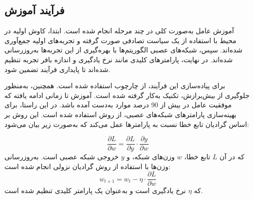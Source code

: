 \subsection{فرآیند آموزش}

آموزش عامل به‌صورت کلی در چند مرحله انجام شده است. ابتدا، کاوش اولیه در محیط با استفاده از یک سیاست تصادفی صورت گرفته و تجربه‌های اولیه جمع‌آوری شده‌اند. سپس، شبکه‌های عصبی الگوریتم‌ها با بهره‌گیری از این تجربه‌ها به‌روزرسانی شده‌اند. در نهایت، پارامترهای کلیدی مانند نرخ یادگیری و اندازه بافر تجربه تنظیم شده‌اند تا پایداری فرآیند تضمین شود.

برای پیاده‌سازی این فرآیند، از چارچوب  استفاده شده است. همچنین، به‌منظور جلوگیری از بیش‌برازش، تکنیک  به‌کار گرفته شده است. آموزش تا زمانی ادامه یافته که موفقیت عامل در بیش از 90 درصد موارد به‌دست آمده باشد. در این راستا، برای بهینه‌سازی پارامترهای شبکه‌های عصبی، از روش  استفاده شده است. این روش بر اساس گرادیان تابع خطا نسبت به پارامترها عمل می‌کند که به‌صورت زیر بیان می‌شود:

\begin{equation}
	\frac{\partial L}{\partial w} = \frac{\partial L}{\partial y} \cdot \frac{\partial y}{\partial w}
\end{equation}
که در آن \( L \) تابع خطا، \( w \) وزن‌های شبکه، و \( y \) خروجی شبکه عصبی است. 
به‌روزرسانی وزن‌ها با استفاده از روش گرادیان نزولی انجام شده است:
\begin{equation}
	w_{t+1} = w_t - \eta \cdot \frac{\partial L}{\partial w}
\end{equation}
که \( \eta \) نرخ یادگیری است و به‌عنوان یک پارامتر کلیدی تنظیم شده است.




